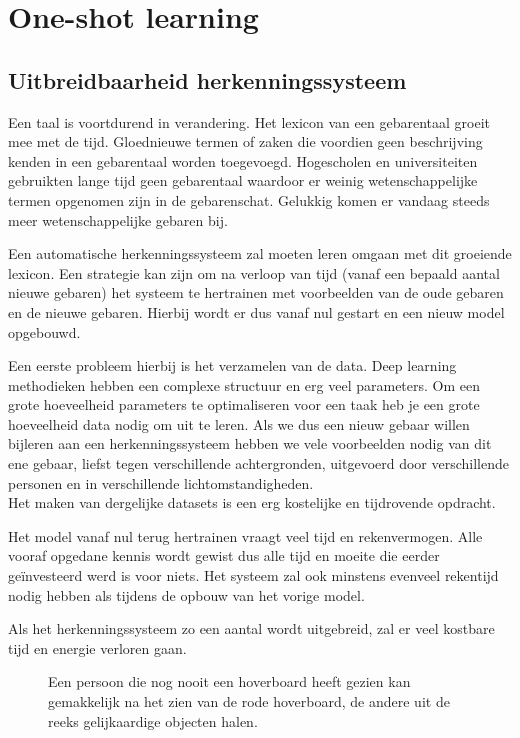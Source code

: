 \section{One-shot learning}

\subsection{Uitbreidbaarheid herkenningssysteem}
Een taal is voortdurend in verandering.
Het lexicon van een gebarentaal groeit mee met de tijd. Gloednieuwe termen of zaken die voordien geen beschrijving kenden in een gebarentaal worden toegevoegd. Hogescholen en universiteiten gebruikten lange tijd geen gebarentaal waardoor er weinig wetenschappelijke termen opgenomen zijn in de gebarenschat. Gelukkig komen er vandaag steeds meer wetenschappelijke gebaren bij.

\npar Een automatische herkenningssysteem zal moeten leren omgaan met dit groeiende lexicon. Een strategie kan zijn om na verloop van tijd (vanaf een bepaald aantal nieuwe gebaren) het systeem te hertrainen met voorbeelden van de oude gebaren en de nieuwe gebaren. Hierbij wordt er dus vanaf nul gestart en een nieuw model opgebouwd.

\npar Een eerste probleem hierbij is het verzamelen van de data. Deep learning methodieken hebben een complexe structuur en erg veel parameters. Om een grote hoeveelheid parameters te optimaliseren voor een taak heb je een grote hoeveelheid data nodig om uit te leren. Als we dus een nieuw gebaar willen bijleren aan een herkenningssysteem hebben we vele voorbeelden nodig van dit ene gebaar, liefst tegen verschillende achtergronden, uitgevoerd door verschillende personen en in verschillende lichtomstandigheden.
\\ Het maken van dergelijke datasets is een erg kostelijke en tijdrovende opdracht.

\npar Het model vanaf nul terug hertrainen vraagt veel tijd en rekenvermogen. Alle vooraf opgedane kennis wordt gewist dus alle tijd en moeite die eerder ge\"investeerd werd is voor niets. Het systeem zal ook minstens evenveel rekentijd nodig hebben als tijdens de opbouw van het vorige model.

\npar Als het herkenningssysteem zo een aantal wordt uitgebreid, zal er veel kostbare tijd en energie verloren gaan.

\begin{figure}[!t]
	\centering
	\def\svgscale{0.8}
	
	\caption{Een persoon die nog nooit een hoverboard heeft gezien kan gemakkelijk na het zien van de rode hoverboard, de andere uit de reeks gelijkaardige objecten halen. }\label{fig:one-shot-analogie}
\end{figure}

